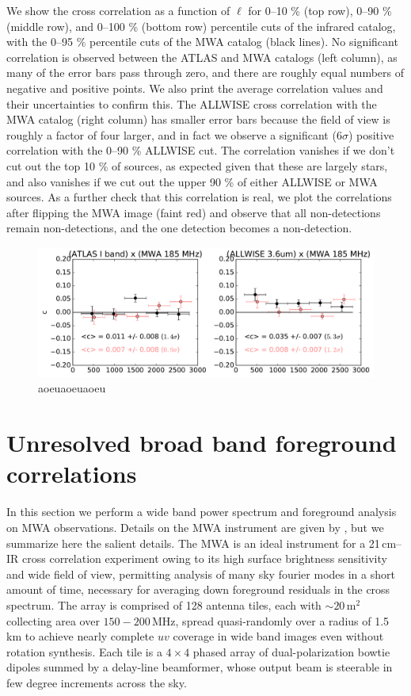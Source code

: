 \documentclass{emulateapj}
\begin{document}
We show the cross correlation as a function of $\ell$ for 0--10 \% (top row), 0--90 \% (middle row), and 0--100 \% (bottom row) percentile cuts of the infrared catalog, with the 0--95 \% percentile cuts of the MWA catalog (black lines). No significant correlation is observed between the ATLAS and MWA catalogs (left column), as many of the error bars pass through zero, and there are roughly equal numbers of negative and positive points. We also print the average correlation values and their uncertainties to confirm this. The ALLWISE cross correlation with the MWA catalog (right column) has smaller error bars because the field of view is roughly a factor of four larger, and in fact we observe a significant (6$\sigma$) positive correlation with the 0--90 \% ALLWISE cut. The correlation vanishes if we don't cut out the top 10 \% of sources, as expected given that these are largely stars, and also vanishes if we cut out the upper 90 \% of either ALLWISE or MWA sources. As a further check that this correlation is real, we plot the correlations after flipping the MWA image (faint red) and observe that all non-detections remain non-detections, and the one detection becomes a non-detection. 

\begin{figure}[h]
\centering
\includegraphics[width=6in]{images/mwa_cor_atlas_allwise.pdf}
\caption{aoeuaoeuaoeu}
\label{fig:corgrid}
\end{figure}


\section{Unresolved broad band foreground correlations}



In this section we perform a wide band power spectrum and foreground analysis on MWA observations. Details on the MWA instrument are given by \citet{tingay13}, but we summarize here the salient details. The MWA is an ideal instrument for a 21\,cm--IR cross correlation experiment owing to its high surface brightness sensitivity and wide field of view, permitting analysis of many sky fourier modes in a short amount of time, necessary for averaging down foreground residuals in the cross spectrum. The array is comprised of 128 antenna tiles, each with $\sim20\,\text{m}^2$ collecting area over $150-200\,$MHz, spread quasi-randomly over a radius of 1.5\,km to achieve nearly complete $uv$ coverage in wide band images even without rotation synthesis. Each tile is a $4\times4$ phased array of dual-polarization bowtie dipoles summed by a delay-line beamformer, whose output beam is steerable in few degree increments across the sky. 
\end{document}
